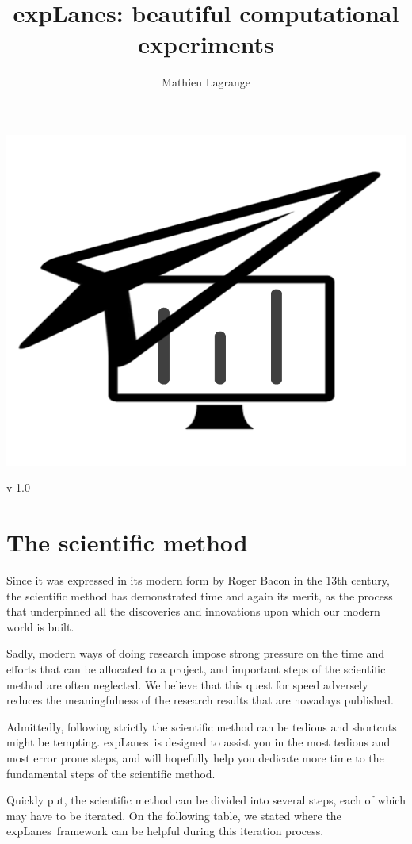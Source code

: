 \documentclass[a4paper,fleqn]{tufte-handout}
\title{ { \color{blue}expLanes}: beautiful computational experiments }
\author{ Mathieu Lagrange }
\makeatletter
\newcommand{\explanes}{\textsf{expLanes}\ }
\renewcommand{\tableofcontents}[1][]{%
  \section*{#1}
  \begin{multicols}{2}
    \@starttoc{toc}
  \end{multicols}
}
\makeatother
\begin{document}
 





\maketitle 

\begin{center}
\includegraphics[width=.4\textwidth]{logo/logo}

{\LARGE \color{blue} v 1.0}
\end{center}


\vspace{-1.5cm}
\tableofcontents


\section{The scientific method}
\hypertarget{science}{}
 
Since it was expressed in its modern form by Roger Bacon in the 13th century, the scientific method has demonstrated time and again its merit, as the process that underpinned all the discoveries and innovations upon which our modern world is built. 

Sadly, modern ways of doing research impose strong pressure on the time and efforts that can be allocated to a project, and important steps of the scientific method are often neglected. We believe that this quest for speed adversely reduces the meaningfulness of the research results that are nowadays published. 

Admittedly, following strictly the scientific method can be tedious and shortcuts might be tempting. \explanes is designed to assist you in the most tedious and most error prone steps, and will hopefully help you dedicate more time to the fundamental steps of the scientific method.

\newpage

Quickly put, the scientific method can be divided into several steps, each of which may have to be iterated. On the following table, we stated where the \explanes framework can be helpful during this iteration process.
\end{document}
